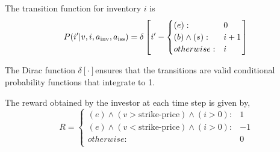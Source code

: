 The transition function for inventory $i$ is 
\begin{equation*}
P(i' | v, i, a_{\text{inv}}, a_{\text{iss}}) = \delta \left[ i' - \begin{cases}
      (e) : & 0 \\ 
      (b) \wedge (s) : & i + 1 \\ 
      otherwise: & i \\ 
    \end{cases} \right] \\    
\end{equation*}

The Dirac function $\delta[\cdot]$ensures that the transitions are valid conditional
probability functions that integrate to 1.

The reward obtained by the investor at each time step is given by,
\begin{equation}
  R = 
    \begin{cases}
      (e) \wedge (v > \text{strike-price}) \wedge (i > 0) : & 1 \\ 
      (e) \wedge (v < \text{strike-price}) \wedge (i > 0) : & -1 \\ 
      otherwise: & 0 \\
    \end{cases} \nonumber
\end{equation}

